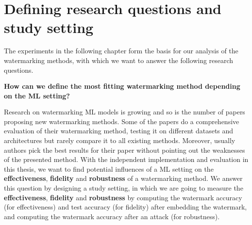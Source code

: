 \chapter{Defining research questions and study setting}
\label{ch:study_setting}

The experiments in the following chapter form the basis for our analysis of the watermarking methods, with which we want to answer the following research questions.

\textbf{How can we define the most fitting watermarking method depending on the ML setting?}

Research on watermarking ML models is growing and so is the number of papers proposing new watermarking methods.
Some of the papers do a comprehensive evaluation of their watermarking method, testing it on different datasets and architectures but rarely compare it to all existing methods. Moreover, usually authors pick the best results for their paper without pointing out the weaknesses of the presented method.
With the independent implementation and evaluation in this thesis, we want to find potential influences of a ML setting on the \textbf{effectiveness}, \textbf{fidelity} and \textbf{robustness} of a watermarking method.
We answer this question by designing a study setting, in which we are going to measure the \textbf{effectiveness}, \textbf{fidelity} and \textbf{robustness} by computing the watermark accuracy (for effectiveness) and test accuracy (for fidelity) after embedding the watermark, and computing the watermark accuracy after an attack (for robustness).

